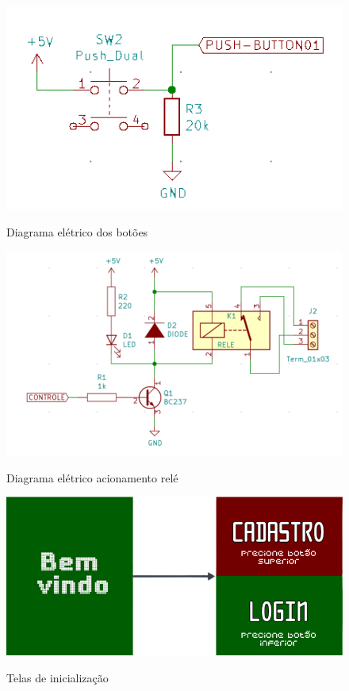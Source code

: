 \begin{figure}[h!]
    \centering
    \caption{Diagrama elétrico dos botões}
    \includegraphics[scale=0.4]{figuras/modulo-push-button.png}
    \fonte{}%
    \label{fig:diagramabotoes}
    \centering
\end{figure}

\begin{figure}[h!]
    \centering
    \caption{Diagrama elétrico acionamento relé}
    \includegraphics[scale=0.4]{figuras/modulo_rele_esquema.png}
    \fonte{}%
    \label{fig:diagramarele}
    \centering
\end{figure}

\begin{figure}[h!]
    \centering
    \caption{Telas de inicialização}
    \includegraphics[scale=0.3]{figuras/fluxo_inicial.png}
    \fonte{}%
    \label{fig:fluxoinicial}
    \centering
\end{figure}

